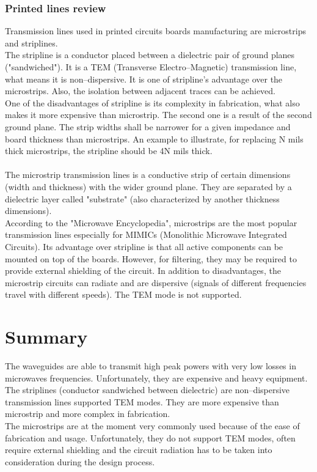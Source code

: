 \documentclass[eng,printmode]{mgr}
\begin{document}
\subsubsection{Printed lines review}
Transmission lines used in printed circuits boards manufacturing are microstrips and striplines.\\
The stripline is a conductor placed between a dielectric pair of ground planes ("sandwiched"). It is a TEM (Transverse Electro--Magnetic) transmission line, what means it is non--dispersive. It is one of stripline's advantage over the microstrips. Also, the isolation between adjacent traces can be achieved.\\
One of the disadvantages of stripline is its complexity in fabrication, what also makes it more expensive than microstrip. The second one is a result of the second ground plane. The strip widths shall be narrower for a given impedance and board thickness than microstrips. 
An example to illustrate, for replacing N mils thick microstrips, the stripline should be 4N mils thick.
\\
\\
The microstrip transmission lines is a conductive strip of certain dimensions (width and thickness) with the wider ground plane. They are separated by a dielectric layer called "substrate" (also characterized by another thickness dimensions). \\According to the "Microwave Encyclopedia", microstrips are the most popular transmission lines especially for MIMICs (Monolithic Microwave Integrated Circuits).
Its advantage over stripline is that all active components can be mounted on top of the boards. However, for filtering, they may be required to provide external shielding of the circuit. In addition to disadvantages, the microstrip circuits can radiate and are dispersive (signals of different frequencies travel with different speeds). The TEM mode is not supported.

\section{Summary}
The waveguides are able to transmit high peak powers with very low losses in microwaves frequencies. Unfortunately, they are expensive and heavy equipment.\\
The striplines (conductor sandwiched between dielectric) are non--dispersive transmission lines supported TEM modes. They are more expensive than microstrip and more complex in fabrication.\\
The microstrips are at the moment very commonly used because of the ease of fabrication and usage. Unfortunately, they do not support TEM modes, often require external shielding and the circuit radiation has to be taken into consideration during the design process.
\end{document}

